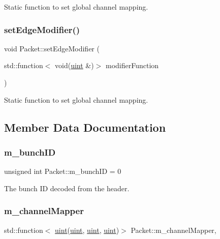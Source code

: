 Static function to set global channel mapping. 

\mbox{\label{class_packet_a2316cd4582e675d52de8c302c192d46f}} 
\subsubsection{\texorpdfstring{set\+Edge\+Modifier()}{setEdgeModifier()}}
{\footnotesize\ttfamily void Packet\+::set\+Edge\+Modifier (\begin{DoxyParamCaption}\item[{std\+::function$<$ void(\hyperlink{_channel_mappings_8cpp_a69aa29b598b851b0640aa225a9e5d61d}{uint} \&)$>$}]{modifier\+Function }\end{DoxyParamCaption})\hspace{0.3cm}{\ttfamily [static]}}



Static function to set global channel mapping. 



\subsection{Member Data Documentation}
\mbox{\label{class_packet_ad0a2dce379a45ee0f899d495f5e760fc}} 
\subsubsection{\texorpdfstring{m\+\_\+bunch\+ID}{m\_bunchID}}
{\footnotesize\ttfamily unsigned int Packet\+::m\+\_\+bunch\+ID = 0\hspace{0.3cm}{\ttfamily [private]}}



The bunch ID decoded from the header. 

\mbox{\label{class_packet_a27f9a040a63e06e20a2097133a588997}} 
\subsubsection{\texorpdfstring{m\+\_\+channel\+Mapper}{m\_channelMapper}}
{\footnotesize\ttfamily std\+::function$<$ \hyperlink{_channel_mappings_8cpp_a69aa29b598b851b0640aa225a9e5d61d}{uint}(\hyperlink{_channel_mappings_8cpp_a69aa29b598b851b0640aa225a9e5d61d}{uint}, \hyperlink{_channel_mappings_8cpp_a69aa29b598b851b0640aa225a9e5d61d}{uint}, \hyperlink{_channel_mappings_8cpp_a69aa29b598b851b0640aa225a9e5d61d}{uint})$>$ Packet\+::m\+\_\+channel\+Mapper\hspace{0.3cm}{\ttfamily [static]}, {\ttfamily [private]}}

